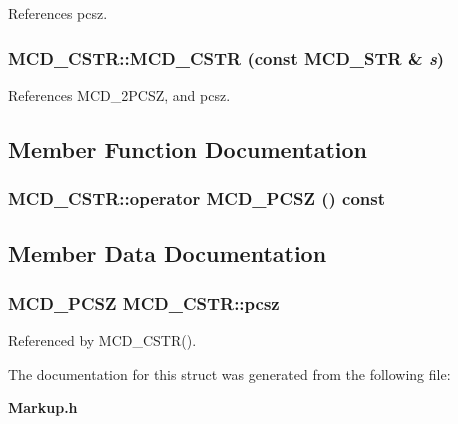References pcsz.
\subsubsection[MCD\_\-CSTR]{\setlength{\rightskip}{0pt plus 5cm}MCD\_\-CSTR::MCD\_\-CSTR (const MCD\_\-STR \& {\em s})\hspace{0.3cm}{\tt  [inline]}}\label{structMCD__CSTR_dc766d196d878fa2eccad9843463508b}




References MCD\_\-2PCSZ, and pcsz.

\subsection{Member Function Documentation}
\subsubsection[operator MCD\_\-PCSZ]{\setlength{\rightskip}{0pt plus 5cm}MCD\_\-CSTR::operator MCD\_\-PCSZ () const\hspace{0.3cm}{\tt  [inline]}}\label{structMCD__CSTR_69c3b0c4b7d049b0eaadcc5822f647ac}




\subsection{Member Data Documentation}
\subsubsection[pcsz]{\setlength{\rightskip}{0pt plus 5cm}MCD\_\-PCSZ {\bf MCD\_\-CSTR::pcsz}}\label{structMCD__CSTR_98868bd66f13bc4be31eab000d45335e}




Referenced by MCD\_\-CSTR().

The documentation for this struct was generated from the following file:\begin{CompactItemize}
\item 
{\bf Markup.h}\end{CompactItemize}
